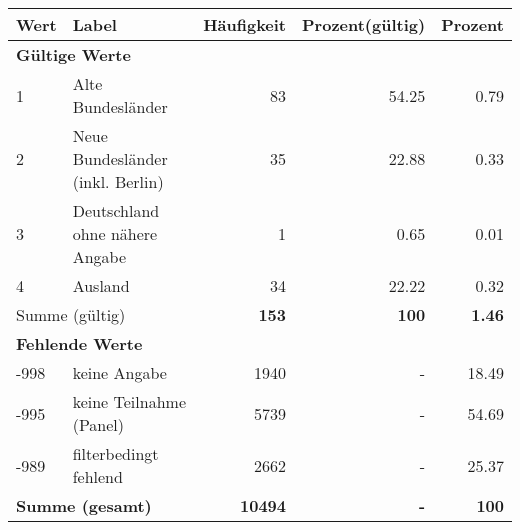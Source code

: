      \begin{longtable}{lXrrr}
     \toprule
     \textbf{Wert} & \textbf{Label} & \textbf{Häufigkeit} & \textbf{Prozent(gültig)} & \textbf{Prozent} \\
     \endhead
     \midrule
     \multicolumn{5}{l}{\textbf{Gültige Werte}}\\

     1 &
     \multicolumn{1}{X}{ Alte Bundesländer   } &


       \num{83} &
       \num[round-mode=places,round-precision=2]{54.25} &
         \num[round-mode=places,round-precision=2]{0.79} \\

     2 &
     \multicolumn{1}{X}{ Neue Bundesländer (inkl. Berlin)   } &


       \num{35} &
       \num[round-mode=places,round-precision=2]{22.88} &
         \num[round-mode=places,round-precision=2]{0.33} \\

     3 &
     \multicolumn{1}{X}{ Deutschland ohne nähere Angabe   } &


       \num{1} &
       \num[round-mode=places,round-precision=2]{0.65} &
         \num[round-mode=places,round-precision=2]{0.01} \\

     4 &
     \multicolumn{1}{X}{ Ausland   } &


       \num{34} &
       \num[round-mode=places,round-precision=2]{22.22} &
         \num[round-mode=places,round-precision=2]{0.32} \\
     \midrule
     \multicolumn{2}{l}{Summe (gültig)} &
       \textbf{\num{153}} &
     \textbf{\num{100}} &
       \textbf{\num[round-mode=places,round-precision=2]{1.46}} \\
     \multicolumn{5}{l}{\textbf{Fehlende Werte}}\\
       -998 &
       keine Angabe &
         \num{1940} &
        - &
         \num[round-mode=places,round-precision=2]{18.49} \\
       -995 &
       keine Teilnahme (Panel) &
         \num{5739} &
        - &
         \num[round-mode=places,round-precision=2]{54.69} \\
       -989 &
       filterbedingt fehlend &
         \num{2662} &
        - &
         \num[round-mode=places,round-precision=2]{25.37} \\
     \midrule
     \multicolumn{2}{l}{\textbf{Summe (gesamt)}} &
          \textbf{\num{10494}} &
        \textbf{-} &
        \textbf{\num{100}} \\
     \bottomrule
     \end{longtable}
     
